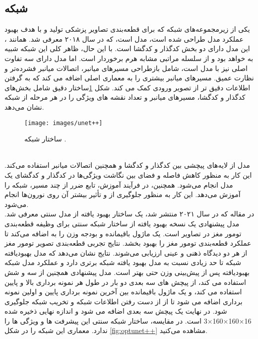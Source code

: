 \subsection{ شبکه }
یکی از زیرمجموعه‌های شبکه  که برای قطعه‌بندی تصاویر پزشکی تولید و با هدف بهبود عملکرد مدل  طراحی شده است، مدل  است، که در سال ۲۰۱۸ معرفی شد. همانند ، این مدل دارای دو بخش کدگذار و کدگشا است. با این حال، ظاهر کلی این شبکه شبیه به  خواهد بود و از سلسله مراتبی مشابه هرم برخوردار است. اما مدل  دارای سه تفاوت اصلی نیز با مدل  است، شامل بازطراحی مسیرهای میانبر، اتصالات میانبر فشرده‌تر و نظارت عمیق.  مسیرهای میانبر بیشتری را به معماری اصلی  اضافه می کند که به گرفتن اطلاعات دقیق تر از تصویر ورودی کمک می کند. شکل \ref{fig:unet++}ساختار دقیق  شامل بخش‌های کدگذار و کدگشا، مسیرهای میانبر و تعداد نقشه های ویژگی را در هر مرحله از شبکه نشان می‌دهد.
\\
\begin{figure}[h]
\centerline{\texttt{[image: images/unet++]}}
\caption[ساختار شبکه ]{ساختار شبکه \cite{li2022unet++}.}
\label{fig:unet++}
\end{figure}
\\
مدل  از لایه‌های پیچشی بین کدگذار و کدگشا و همچنین اتصالات میانبر استفاده می‌کند. این کار به منظور کاهش فاصله و فضای بین نگاشت ویژگی‌ها در کدگذار و کدگشای یک مدل  انجام می‌شود. همچنین، در فرآیند آموزش، تابع ضرر از چند مسیر، شبکه را آموزش می‌دهد. این کار به منظور جلوگیری از  و تأثیر بیشتر آن روی نورون‌ها انجام می‌شود\cite{li2022unet++}. 
\\
در مقاله \cite{hou2021brain} که در سال ۲۰۲۱ منتشر شد، یک ساختار بهبود یافته از مدل سنتی  معرفی شد. مدل پیشنهادی یک نسخه بهبود یافته از ساختار شبکه سنتی  برای وظیفه قطعه‌بندی تومور مغز در تصاویر  است. یک ماژول باقیمانده و بودجه وزن را به  اضافه می‌کند تا عملکرد قطعه‌بندی تومور مغز را بهبود بخشد. نتایج تجربی قطعه‌بندی تصویر  تومور مغز از هر دو دیدگاه ذهنی و عینی ارزیابی می‌شوند. نتایج نشان می‌دهد که مدل بهبودیافته شبکه  تا حد زیادی نسبت به مدل بهبود یافته شبکه  برتری دارد و عملکرد مدل شبکه بهبودیافته  پس از پیش‌بینی وزن حتی بهتر است. مدل پیشنهادی همچنین از سه  و شش  استفاده می کند، از پیچش های سه بعدی دو بار در طول هر نمونه برداری بالا و پایین استفاده می کند، و یک ماژول باقیمانده بین آخرین نمونه برداری پایین و اولین نمونه برداری اضافه می شود تا از از دست رفتن اطلاعات شبکه و تخریب شبکه جلوگیری شود. در نهایت یک پیچش سه بعدی اضافه می شود و اندازه نهایی ذخیره شده 16×160×160×3 است. در مقایسه، ساختار شبکه سنتی  این پیشرفت ها و ویژگی ها را ندارد. معماری این شبکه را در شکل \ref{fig:optunet++} مشاهده می‌کنید. 


